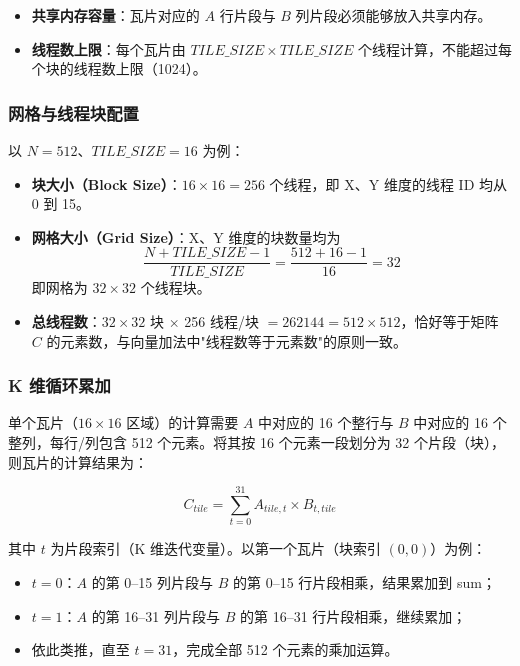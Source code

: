 \begin{itemize}
    \item \textbf{共享内存容量}：瓦片对应的 $A$ 行片段与 $B$ 列片段必须能够放入共享内存。
    \item \textbf{线程数上限}：每个瓦片由 $TILE\_SIZE \times TILE\_SIZE$ 个线程计算，不能超过每个块的线程数上限（1024）。
\end{itemize}

\subsubsection{网格与线程块配置}

以 $N = 512$、$TILE\_SIZE = 16$ 为例：

\begin{itemize}
    \item \textbf{块大小（Block Size）}：$16 \times 16 = 256$ 个线程，即 X、Y 维度的线程 ID 均从 0 到 15。
    \item \textbf{网格大小（Grid Size）}：X、Y 维度的块数量均为
    \[
    \frac{N + TILE\_SIZE - 1}{TILE\_SIZE} = \frac{512 + 16 - 1}{16} = 32
    \]
    即网格为 $32 \times 32$ 个线程块。
    \item \textbf{总线程数}：$32 \times 32$ 块 $\times$ 256 线程/块 $= 262144 = 512 \times 512$，恰好等于矩阵 $C$ 的元素数，与向量加法中"线程数等于元素数"的原则一致。
\end{itemize}

\subsubsection{K 维循环累加}

单个瓦片（$16 \times 16$ 区域）的计算需要 $A$ 中对应的 16 个整行与 $B$ 中对应的 16 个整列，每行/列包含 512 个元素。将其按 16 个元素一段划分为 32 个片段（块），则瓦片的计算结果为：

\[
C_{tile} = \sum_{t=0}^{31} A_{tile,t} \times B_{t,tile}
\]

其中 $t$ 为片段索引（K 维迭代变量）。以第一个瓦片（块索引 $(0,0)$）为例：

\begin{itemize}
    \item $t=0$：$A$ 的第 0--15 列片段与 $B$ 的第 0--15 行片段相乘，结果累加到 sum；
    \item $t=1$：$A$ 的第 16--31 列片段与 $B$ 的第 16--31 行片段相乘，继续累加；
    \item 依此类推，直至 $t=31$，完成全部 512 个元素的乘加运算。
\end{itemize}

